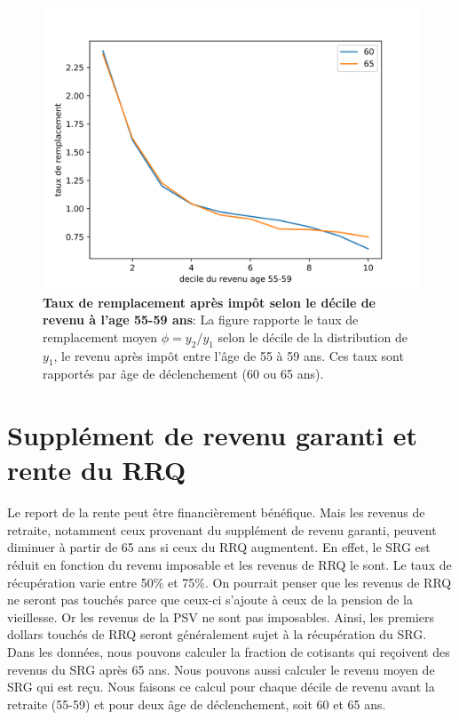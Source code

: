 \documentclass[french, 12pt]{article}
\begin{document}
	
	\begin{figure}[!htbp]
	\centering 
	\includegraphics[scale=0.75]{../figures/reprates_decile.png}
	\caption{\textbf{Taux de remplacement après impôt selon le décile de revenu à l'age 55-59 ans}: La figure rapporte le taux de remplacement moyen $\phi = y_2/y_1$ selon le décile de la distribution de $y_1$, le revenu après impôt entre l'âge de 55 à 59 ans. Ces taux sont rapportés par âge de déclenchement (60 ou 65 ans). }
	\label{fig:reprates}
	\end{figure}		
	
	
	\section{Supplément de revenu garanti et rente du RRQ}
	
	Le report de la rente peut être financièrement bénéfique. Mais les revenus de retraite, notamment ceux provenant du supplément de revenu garanti, peuvent diminuer à partir de 65 ans si ceux du RRQ augmentent. En effet, le SRG est réduit en fonction du revenu imposable et les revenus de RRQ le sont. Le taux de récupération varie entre 50\% et 75\%. On pourrait penser que les revenus de RRQ ne seront pas touchés parce que ceux-ci s'ajoute à ceux de la pension de la vieillesse. Or les revenus de la PSV ne sont pas imposables. Ainsi, les premiers dollars touchés de RRQ seront généralement sujet à la récupération du SRG. Dans les données, nous pouvons calculer la fraction de cotisants qui reçoivent des revenus du SRG après 65 ans. Nous pouvons aussi calculer le revenu moyen de SRG qui est reçu. Nous faisons ce calcul pour chaque décile de revenu avant la retraite (55-59) et pour deux âge de déclenchement, soit 60 et 65 ans. 
	
\end{document}

